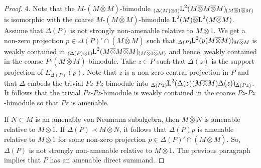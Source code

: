 \documentclass[a4paper,11pt]{amsart}
\numberwithin{equation}{section}
\begin{document}
\begin{proof}
4. Note that the $M$-$(M {\mathbin{\overline{\otimes}}} M)$-bimodule ${\mathord{\raisebox{-0.4ex}[0ex][0ex]{\scriptsize ${({\Delta}(M) {\otimes} 1)}$}{{{\mathord{\text{\rm L}}}^2(M {\mathbin{\overline{\otimes}}} M {\mathbin{\overline{\otimes}}} M)}}\hspace{-0.2ex}\raisebox{-0.4ex}[0ex][0ex]{\scriptsize ${(M {\mathbin{\overline{\otimes}}} 1 {\mathbin{\overline{\otimes}}} M)}$}}}$ is isomorphic with the coarse $M$-$(M {\mathbin{\overline{\otimes}}} M)$-bimodule ${\mathord{\text{\rm L}}}^2(M) {\mathbin{\overline{\otimes}}} {\mathord{\text{\rm L}}}^2(M {\mathbin{\overline{\otimes}}} M)$. Assume that ${\Delta}(P)$ is not strongly non-amenable relative to $M {\otimes} 1$. We get a non-zero projection $p \in {\Delta}(P)' \cap (M {\mathbin{\overline{\otimes}}} M)$ such that ${\mathord{\raisebox{-0.4ex}[0ex][0ex]{\scriptsize ${{\Delta}(P)}$}{{{\mathord{\text{\rm L}}}^2(p (M {\mathbin{\overline{\otimes}}} M))}}\hspace{-0.2ex}\raisebox{-0.4ex}[0ex][0ex]{\scriptsize ${M {\mathbin{\overline{\otimes}}} M}$}}}$ is weakly contained in ${\mathord{\raisebox{-0.4ex}[0ex][0ex]{\scriptsize ${({\Delta}(P) {\otimes} 1)}$}{{{\mathord{\text{\rm L}}}^2(M {\mathbin{\overline{\otimes}}} M {\mathbin{\overline{\otimes}}} M)}}\hspace{-0.2ex}\raisebox{-0.4ex}[0ex][0ex]{\scriptsize ${(M {\mathbin{\overline{\otimes}}} 1 {\mathbin{\overline{\otimes}}} M)}$}}}$ and hence, weakly contained in the coarse $P$-$(M {\mathbin{\overline{\otimes}}} M)$-bimodule. Take $z \in P$ such that ${\Delta}(z)$ is the support projection of $E_{{\Delta}(P)}(p)$. Note that $z$ is a non-zero central projection in $P$ and that ${\Delta}$ embeds the trivial $Pz$-$Pz$-bimodule into ${\mathord{\raisebox{-0.4ex}[0ex][0ex]{\scriptsize ${{\Delta}(Pz)}$}{{{\mathord{\text{\rm L}}}^2({\Delta}(z) (M {\mathbin{\overline{\otimes}}} M) {\Delta}(z))}}\hspace{-0.2ex}\raisebox{-0.4ex}[0ex][0ex]{\scriptsize ${{\Delta}(Pz)}$}}}$. It follows that the trivial $Pz$-$Pz$-bimodule is weakly contained in the coarse $Pz$-$Pz$-bimodule so that $Pz$ is amenable.

If $N \subset M$ is an amenable von Neumann subalgebra, then $M {\mathbin{\overline{\otimes}}} N$ is amenable relative to $M {\otimes} 1$. If ${\Delta}(P) {\prec} M {\mathbin{\overline{\otimes}}} N$, it follows that ${\Delta}(P) p$ is amenable relative to $M {\otimes} 1$ for some non-zero projection $p \in {\Delta}(P)' \cap (M {\mathbin{\overline{\otimes}}} M)$. So, ${\Delta}(P)$ is not strongly non-amenable relative to $M {\otimes} 1$. The previous paragraph implies that $P$ has an amenable direct summand.
\end{proof}
\end{document}
